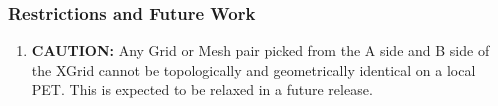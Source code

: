 
\subsubsection{Restrictions and Future Work}

\begin{enumerate}
\label{XGrid:rest}

\item {\bf CAUTION:} Any Grid or Mesh pair picked from the A side and B side of the XGrid 
cannot be topologically and geometrically identical on a local PET. This is expected to
be relaxed in a future release. 

\end{enumerate}



